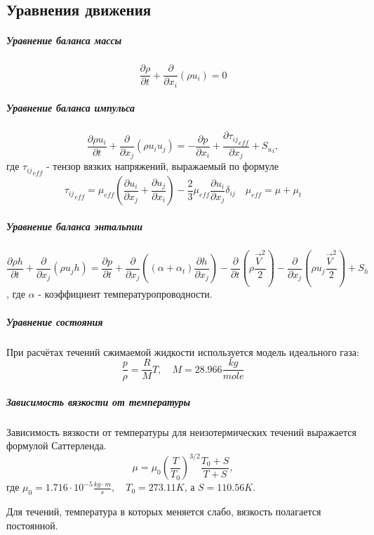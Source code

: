 \subsection{Уравнения движения}
		\subparagraph{Уравнение баланса массы\\}
			\begin{equation}
				\frac{\partial \rho}{\partial t} + \frac{\partial}{\partial x_i}(\rho u_i) = 0
			\end{equation}
		\subparagraph{Уравнение баланса импульса\\}
			\begin{equation}
				\frac{\partial \rho u_i}{\partial t} + \frac{\partial}{\partial x_j}(\rho u_iu_j) = - \frac{\partial p}{\partial x_i} + \frac{\partial {\tau_{ij}}_{eff}}{\partial x_j} + {S_u}_i,
			\end{equation}
			где ${\tau_{ij}}_{eff}$ - тензор вязких напряжений, выражаемый по формуле
			\begin{equation}
				{\tau_{ij}}_{eff} = \mu_{eff}\left( \frac{\partial u_i}{\partial x_j} + \frac{\partial u_j}{\partial x_i} \right) - \frac{2}{3}\mu_{eff}\frac{\partial u_i}{\partial x_j} \delta_{ij} \quad \mu_{eff} = \mu + \mu_{t}
			\end{equation}
		\subparagraph{Уравнение баланса энтальпии\\}
		\begin{equation}
			\frac{\partial \rho h}{\partial t} + \frac{\partial}{\partial x_j} (\rho u_j h) = \frac{\partial p}{\partial t} + \frac{\partial}{\partial x_j} \left((\alpha + \alpha_t) \frac{\partial h}{\partial x_j}\right) - \frac{\partial}{\partial t}\left(\rho \frac{\vec{V}^2}{2}\right) - \frac{\partial}{\partial x_j}\left(\rho u_j \frac{\vec{V}^2}{2}\right) + S_h
		\end{equation}
		, где $\alpha$ - коэффициент температуропроводности.
		\subparagraph{Уравнение состояния\\}
			\hspace{2em}При расчётах течений сжимаемой жидкости используется модель идеального газа:
			\begin{equation}
				\frac{p}{\rho} = \frac{R}{M}T, \quad M = 28.966 \frac{kg}{mole}
			\end{equation}
		\subparagraph{Зависимость вязкости от температуры\\}
				\hspace{2em}Зависимость вязкости от температуры для неизотермических течений выражается формулой Саттерленда.
				\begin{equation}
					\mu = \mu_0 \left(\frac{T}{T_0}\right)^{3/2} \frac{T_0 + S}{T + S},
				\end{equation}
					где $\mu_0 = 1.716 \cdot 10^{-5} \frac{kg \cdot m}{s}, \quad T_0 = 273.11 K$, а $S=110.56 K$.
					
				Для течений, температура в которых меняется слабо, вязкость полагается постоянной.
